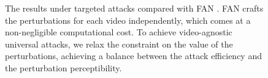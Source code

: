 \documentclass[journal]{IEEEtran}
\begin{document}
\begin{figure}[t]
  \centering
  \vspace{-1mm}
  \caption{The results under targeted attacks compared with FAN \cite{FAN}.  FAN crafts the perturbations for each video independently, which comes at a non-negligible computational cost. To achieve video-agnostic universal attacks, we relax the constraint on the value of the perturbations, achieving a balance between the attack efficiency and the perturbation perceptibility.}
  \label{fig:vis_fan}
  \vspace{-4mm}
\end{figure}
\end{document}
